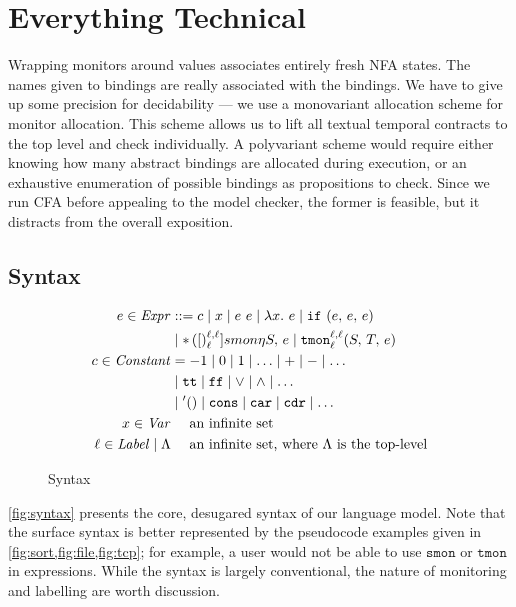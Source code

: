 \documentclass[preprint,onecolumn,9pt]{sigplanconf} %
\begin{document}
\section{Everything Technical}\label{sec:technical}

Wrapping monitors around values associates entirely fresh NFA states.
%
The names given to bindings are really associated with the bindings.
%
We have to give up some precision for decidability --- we use a monovariant allocation scheme for monitor allocation.
%
This scheme allows us to lift all textual temporal contracts to the top level and check individually.
%
A polyvariant scheme would require either knowing how many abstract bindings are allocated during execution, or an exhaustive enumeration of possible bindings as propositions to check.
%
Since we run CFA before appealing to the model checker, the former is feasible, but it distracts from the overall exposition.

\subsection{Syntax}

\begin{figure}
\begin{align*}
e \in \mathit{Expr} &::=
      c
 \mid x
 \mid e\ e
 \mid \lambda x.\ e
 \mid {\tt if}{\ }({e,\,e,\,e}) \\
&\mid {\tt *}{\,}({[})^{\ell,\ell}_{\ell}]{smon}{\eta}{S,\, e}
 \mid {\tt tmon}{^{\ell,\ell}_{\ell}}({S,\,T,\,e}) \\
c \in \mathit{Constant} &=
 -1 \mid 0 \mid 1 \mid \ldots \mid + \mid - \mid \ldots \\
&\mid {\tt tt} \mid {\tt ff} \mid \vee \mid \wedge \mid \ldots \\
&\mid {\tt '()} \mid \tt cons \mid {\tt car} \mid {\tt cdr} \mid \ldots \\
x \in \mathit{Var} &\quad\text{ an infinite set} \\
\ell \in \mathit{Label} \mid \Lambda &\quad\text{ an infinite set, where $\Lambda$ is the top-level}
\end{align*}
\caption{Syntax}
\label{fig:syntax}
\end{figure}

%
\autoref{fig:syntax} presents the core, desugared syntax of our language model.
%
Note that the surface syntax is better represented by the pseudocode examples given in \cref{fig:sort,fig:file,fig:tcp}; for example, a user would not be able to use $\mathtt{smon}$ or $\mathtt{tmon}$ in expressions.
%
While the syntax is largely conventional, the nature of monitoring and labelling are worth discussion.
\end{document}
